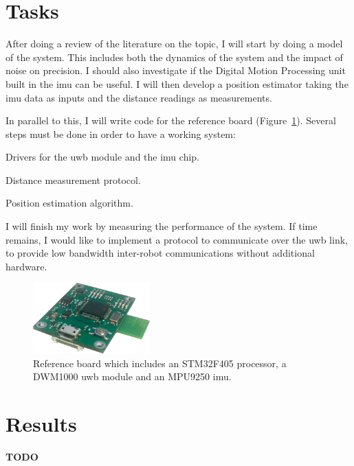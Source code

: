 \documentclass[a4paper,twocolumn]{article}
\begin{document}
\section{Tasks}

After doing a review of the literature on the topic, I will start by doing a model of the system.
This includes both the dynamics of the system and the impact of noise on precision.
I should also investigate if the Digital Motion Processing unit built in the \gls{imu} can be useful.
I will then develop a position estimator taking the \gls{imu} data as inputs and the distance readings as measurements.

In parallel to this, I will write code for the reference board (Figure~\ref{fig:board}).
Several steps must be done in order to have a working system:
\begin{inparaenum}
    \item Drivers for the \gls{uwb} module and the \gls{imu} chip.
    \item Distance measurement protocol.
    \item Position estimation algorithm.
\end{inparaenum}

I will finish my work by measuring the performance of the system.
If time remains, I would like to implement a protocol to communicate over the \gls{uwb} link, to provide low bandwidth inter-robot communications without additional hardware.

\begin{figure}[h!]
    \centering
    \includegraphics[width=0.4\textwidth]{figures/board}
    \caption{Reference board which includes an STM32F405 processor, a DWM1000 \gls{uwb} module and an MPU9250 \gls{imu}.}
    \label{fig:board}
\end{figure}

\section{Results}
\textbf{TODO}
\end{document}
